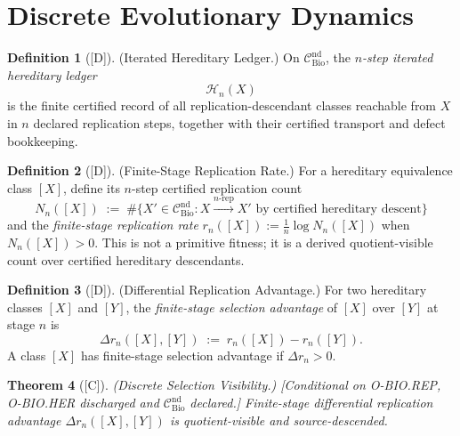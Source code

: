 \documentclass[12pt,oneside]{amsbook}
\theoremstyle{plain}
\newtheorem{theorem}{Theorem}[section]
\theoremstyle{definition}
\newtheorem{definition}[theorem]{Definition}
\theoremstyle{remark}
\newcommand{\status}[1]{\textup{[#1]}}
\begin{document}
\section{Discrete Evolutionary Dynamics}\label{sec:bio-EVO-discrete}

\begin{definition}[\status{D}]\label{def:bio-iterated-hereditary-ledger}
\textup{(Iterated Hereditary Ledger.)}
On $\mathcal{C}_{\mathrm{Bio}}^{\mathrm{nd}}$, the
\emph{$n$-step iterated hereditary ledger}
\[
 \mathcal{H}_n(X)
\]
is the finite certified record of all replication-descendant classes
reachable from $X$ in $n$ declared replication steps, together with
their certified transport and defect bookkeeping.
\end{definition}

\begin{definition}[\status{D}]\label{def:bio-replication-rate}
\textup{(Finite-Stage Replication Rate.)}
For a hereditary equivalence class $[X]$, define its $n$-step
certified replication count
\[
 N_n([X]) \;:=\;
 \#\bigl\{X' \in \mathcal{C}_{\mathrm{Bio}}^{\mathrm{nd}} :
 X \xrightarrow{n\text{-rep}} X'
 \text{ by certified hereditary descent}\bigr\}
\]
and the \emph{finite-stage replication rate}
$r_n([X]) := \tfrac{1}{n}\log N_n([X])$
when $N_n([X]) > 0$.
This is not a primitive fitness; it is a derived quotient-visible
count over certified hereditary descendants.
\end{definition}

\begin{definition}[\status{D}]\label{def:bio-differential-replication-advantage}
\textup{(Differential Replication Advantage.)}
For two hereditary classes $[X]$ and $[Y]$, the
\emph{finite-stage selection advantage} of $[X]$ over $[Y]$ at
stage $n$ is
\[
 \Delta r_n([X],[Y]) \;:=\; r_n([X]) - r_n([Y]).
\]
A class $[X]$ has finite-stage selection advantage if $\Delta r_n > 0$.
\end{definition}

\begin{theorem}[\status{C}]\label{thm:bio-EVO-discrete-selection}
\textup{(Discrete Selection Visibility.)}
\textup{[Conditional on O-BIO.REP, O-BIO.HER discharged and
$\mathcal{C}_{\mathrm{Bio}}^{\mathrm{nd}}$ declared.]}
Finite-stage differential replication advantage
$\Delta r_n([X],[Y])$ is quotient-visible and source-descended.
\end{theorem}
\end{document}
